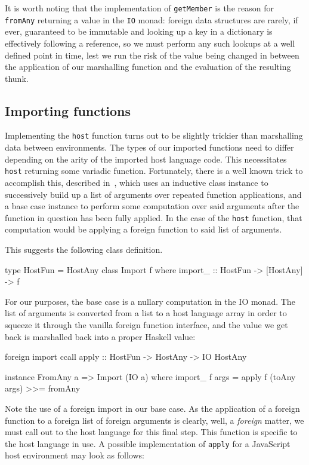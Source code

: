 \documentclass[preprint]{sigplanconf}
\begin{document}
It is worth noting that the implementation of \lstinline!getMember! is
the reason for \lstinline!fromAny! returning a value in the \lstinline!IO!
monad: foreign data structures are rarely, if ever, guaranteed to be immutable
and looking up a key in a dictionary is effectively following a reference,
so we must perform any such lookups at a well defined point in time,
lest we run the risk of the value being changed in between the application
of our marshalling function and the evaluation of the resulting thunk.

\subsection{Importing functions}\label{sec:import}
Implementing the \lstinline!host! function turns out to be slightly trickier
than marshalling data between environments.
The types of our imported functions need to differ depending on the arity of
the imported host language code. This necessitates \lstinline!host! returning
some variadic function. Fortunately, there is a well known trick to accomplish
this, described in\ \cite{printf}, which uses an inductive class instance to
successively build up a list of arguments over repeated function applications,
and a base case instance to perform some computation over said arguments after
the function in question has been fully applied.
In the case of the \lstinline!host! function, that computation would be
applying a foreign function to said list of arguments.

This suggests the following class definition.

\begin{code}
  type HostFun = HostAny
  class Import f where
    import_ :: HostFun -> [HostAny] -> f
\end{code}

For our purposes, the base case is a nullary computation in the IO monad.
The list of arguments is converted from a list to
a host language array in order to squeeze it through the vanilla foreign
function interface, and the value we get back is marshalled back into a proper
Haskell value:

\begin{code}
  foreign import ccall
    apply :: HostFun -> HostAny -> IO HostAny

  instance FromAny a => Import (IO a) where
    import_ f args =
      apply f (toAny args) >>= fromAny
\end{code}

Note the use of a foreign import in our base case. As the application of a
foreign function to a foreign list of foreign arguments is clearly, well, a
\emph{foreign} matter, we must call out to the host language for this final
step.
This function is specific to the host language in use. A possible
implementation of \lstinline!apply! for a JavaScript host environment may look
as follows:
\end{document}
